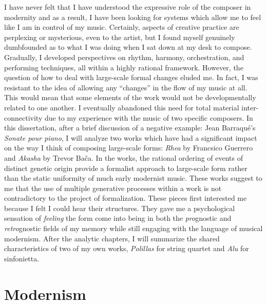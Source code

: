 I have never felt that I have understood the expressive role of the composer in modernity and as a result, I have been looking for systems which allow me to feel like I am in control of my music. Certainly, aspects of creative practice are perplexing or mysterious, even to the artist, but I found myself genuinely dumbfounded as to what I was doing when I sat down at my desk to compose. Gradually, I developed perspectives on rhythm, harmony, orchestration, and performing techniques, all within a highly rational framework. However, the question of how to deal with large-scale formal changes eluded me. In fact, I was resistant to the idea of allowing any ``changes'' in the flow of my music at all. This would mean that some elements of the work would not be developmentally related to one another. I eventually abandoned this need for total material inter-connectivity due to my experience with the music of two specific composers. In this dissertation, after a brief discussion of a negative example: Jean Barraqué's \textit{Sonate pour piano}, I will analyze two works which have had a significant impact on the way I think of composing large-scale forms: \textit{Rhea} by Francsico Guerrero and \textit{Akasha} by Trevor Bača. In the works, the rational ordering of events of distinct genetic origin provide a formalist approach to large-scale form rather than the static uniformity of much early modernist music. These works suggest to me that the use of multiple generative processes within a work is not contradictory to the project of formalization. These pieces first interested me because I felt I could hear their structures. They gave me a psychological sensation of \textit{feeling} the form come into being in both the \textit{pro}gnostic and \textit{retro}gnostic fields of my memory while still engaging with the language of musical modernism. After the analytic chapters, I will summarize the shared characteristics of two of my own works, \textit{Polillas} for string quartet and \textit{Alu} for sinfonietta.

\section{Modernism}

